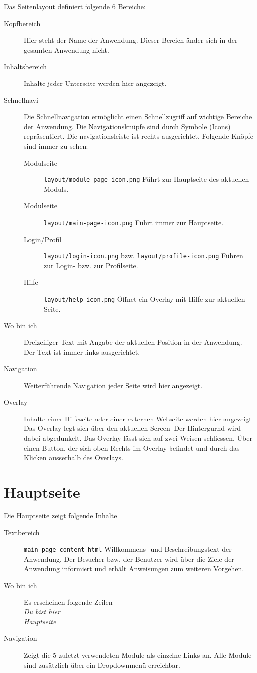 Das Seitenlayout definiert folgende 6 Bereiche:
\begin{description}
  \item[Kopfbereich] Hier steht der Name der Anwendung. Dieser Bereich änder sich in der gesamten Anwendung nicht.
  \item[Inhaltsbereich] Inhalte jeder Unterseite werden hier angezeigt.
  \item[Schnellnavi] Die Schnellnavigation ermöglicht einen Schnellzugriff auf wichtige Bereiche der Anwendung. Die Navigationsknüpfe sind durch Symbole (Icons) repräsentiert. Die navigationsleiste ist rechts ausgerichtet. Folgende Knöpfe sind immer zu sehen:
  \begin{description}
    \item[Modulseite] \texttt{layout/module-page-icon.png} Führt zur Hauptseite des aktuellen Moduls. 
    \item[Modulseite] \texttt{layout/main-page-icon.png} Führt immer zur Hauptseite. 
    \item[Login/Profil] \texttt{layout/login-icon.png} bzw. \texttt{layout/profile-icon.png} Führen zur Login- bzw. zur Profilseite. 
    \item[Hilfe] \texttt{layout/help-icon.png} Öffnet ein Overlay mit Hilfe zur aktuellen Seite. 
  \end{description}
  
  \item[Wo bin ich] Dreizeiliger Text mit Angabe der aktuellen Position in der Anwendung. Der Text ist immer links ausgerichtet.
  \item[Navigation] Weiterführende Navigation jeder Seite wird hier angezeigt.
  \item[Overlay] Inhalte einer Hilfeseite oder einer externen Webseite werden hier angezeigt. Das Overlay legt sich 
  über den aktuellen Screen. Der Hintergurnd wird dabei abgedunkelt. Das Overlay lässt sich auf zwei Weisen schliessen. Über einen Button, der sich oben Rechts im Overlay befindet und durch das Klicken ausserhalb des Overlays.
\end{description}


%
%
%
\section{Hauptseite}
\label{sec:main-page}

Die Hauptseite zeigt folgende Inhalte
\begin{description}
  \item[Textbereich] \texttt{main-page-content.html} Willkommens- und Beschreibungstext der Anwendung. Der Besucher bzw. der Benutzer wird über die Ziele der Anwendung informiert und erhält Anweisungen zum weiteren Vorgehen.
  \item[Wo bin ich] Es erscheinen folgende Zeilen \emph{\\Du bist hier \\Hauptseite}
  \item[Navigation] Zeigt die 5 zuletzt verwendeten Module als einzelne Links an. Alle Module sind zusätzlich über ein Dropdownmenü erreichbar.
	
\end{description}




